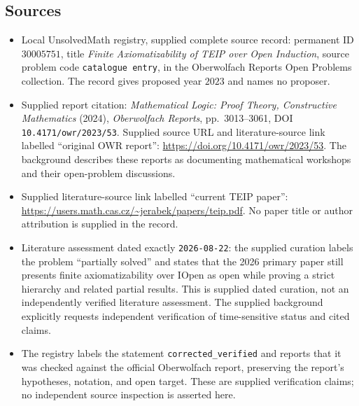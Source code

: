 \documentclass[11pt]{article}
\begin{document}
\subsection{Sources}
\begin{itemize}
\item Local UnsolvedMath registry, supplied complete source record: permanent ID \(30005751\), title \emph{Finite Axiomatizability of TEIP over Open Induction}, source problem code \texttt{catalogue entry}, in the Oberwolfach Reports Open Problems collection. The record gives proposed year \(2023\) and names no proposer.
\item Supplied report citation: \emph{Mathematical Logic: Proof Theory, Constructive Mathematics} (2024), \emph{Oberwolfach Reports}, pp.\ 3013--3061, DOI \texttt{10.4171/owr/2023/53}. Supplied source URL and literature-source link labelled ``original OWR report'': \url{https://doi.org/10.4171/owr/2023/53}. The background describes these reports as documenting mathematical workshops and their open-problem discussions.
\item Supplied literature-source link labelled ``current TEIP paper'': \url{https://users.math.cas.cz/~jerabek/papers/teip.pdf}. No paper title or author attribution is supplied in the record.
\item Literature assessment dated exactly \texttt{2026-08-22}: the supplied curation labels the problem ``partially solved'' and states that the 2026 primary paper still presents finite axiomatizability over \(\mathrm{IOpen}\) as open while proving a strict hierarchy and related partial results. This is supplied dated curation, not an independently verified literature assessment. The supplied background explicitly requests independent verification of time-sensitive status and cited claims.
\item The registry labels the statement \texttt{corrected\_verified} and reports that it was checked against the official Oberwolfach report, preserving the report's hypotheses, notation, and open target. These are supplied verification claims; no independent source inspection is asserted here.
\end{itemize}
\end{document}
